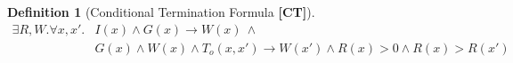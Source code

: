 \documentclass[preprint]{sigplanconf}
\theoremstyle{definition}
\newtheorem{definition}[theorem]{Definition}
\begin{document}


\begin{figure*}
 \begin{framed}

\begin{definition}[Conditional Termination Formula {\bf [CT]}]
\label{def:ct}
 \begin{align*}
  \exists R, W . \forall x, x' . & I(x) \wedge G(x) \rightarrow W(x) ~ \wedge \\
                                 & G(x) \wedge W(x) \wedge T_o(x, x') \rightarrow W(x') \wedge R(x) > 0 
  \wedge R(x) > R(x')
 \end{align*}
\end{definition}




\end{framed}
\end{figure*}
\end{document}
